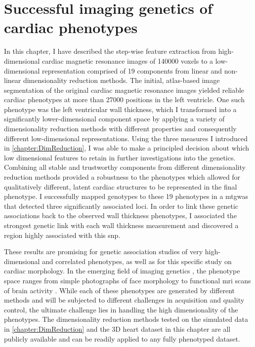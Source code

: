 \newpage
\section{Successful imaging genetics of cardiac phenotypes}
In this chapter, I have described the step-wise feature extraction from high-dimensional cardiac magnetic resonance images of \num{140000} voxels to a low-dimensional  representation comprised of \num{19} components from linear and non-linear dimensionality reduction methods. The initial, atlas-based image segmentation of the original cardiac magnetic resonance images yielded reliable cardiac phenotypes at more than \num{27000} positions in the left ventricle. One such phenotype was the left ventricular wall thickness, which I transformed into a significantly lower-dimensional component space by applying a variety of dimensionality reduction methods with different properties and consequently different low-dimensional representations. Using the three measures I introduced in \cref{chapter:DimReduction}, I was able to make a principled decision about which low dimensional features to retain in further investigations into the genetics. Combining all stable and trustworthy components from different dimensionality reduction methods provided a robustness to the phenotypes which allowed for qualitatively different, latent cardiac structures to be represented in the final phenotype. I successfully mapped genotypes to these \num{19} phenotypes in a \gls{mtgwas} that detected three significantly associated loci. In order to link these genetic associations back to the observed wall thickness phenotypes, I associated the strongest genetic link with each wall thickness measurement and discovered a region highly associated with this \gls{snp}.  

These results are promising for genetic association studies of very high-dimensional and correlated phenotypes, as well as for this specific study on cardiac morphology. In the emerging field of imaging genetics \citep{Ge2014}, the phenotype space ranges from simple photographs of face morphology \citep{Liu2012,Shaffer2016} to functional \gls{mri} scans of brain activity  \citep{Stein2010,Hibar2015}. While each of these phenotypes are generated by different methods and will be subjected to different challenges in acquisition and quality control, the ultimate challenge lies in handling the high dimensionality of the phenotypes. The dimensionality reduction methods tested on the simulated data in \cref{chapter:DimReduction} and the 3D heart dataset in this chapter are all publicly available and can be readily applied to any fully phenotyped dataset. 

